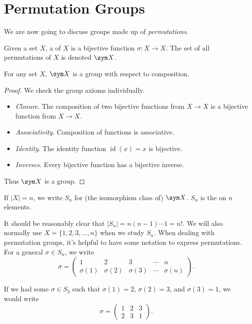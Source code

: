 \documentclass[a4]{scrreprt}
\newcommand{\newsection}{\section}
\begin{document}
\newsection{Permutation Groups}

We are now going to discuss groups made up of \emph{permutations}.

\begin{definition}[Permutations]
	Given a set $X$, a  of $X$ is a bijective function $\sigma: X \rightarrow X$. The set of all permutations of $X$ is denoted $\sym X$.
\end{definition}

\begin{theorem}
	For any set $X$, $\sym X$ is a group with respect to composition. 
\end{theorem}
\begin{proof}
	We check the group axioms individually.
	\begin{itemize}
		\item \emph{Closure}. The composition of two bijective functions from $X \rightarrow X$ is a bijective function from $X \rightarrow X$.
		\item \emph{Associativity}. Composition of functions is associative.
		\item \emph{Identity}. The identity function $\operatorname{id}(x) = x$ is bijective.
		\item \emph{Inverses}. Every bijective function has a bijective inverse.
	\end{itemize}
	Thus $\sym X$ is a group.
\end{proof}

\begin{definition}
	If $|X| = n$, we write $S_n$ for (the isomorphism class of) $\sym X$. $S_n$ is the  on $n$ elements.
\end{definition}

It should be reasonably clear that $|S_n| = n(n - 1) \cdots 1 = n!$. We will also normally use $X = \{1, 2, 3, \dots, n \}$ when we study $S_n$. When dealing with permutation groups, it's helpful to have some notation to express permutations. For a general $\sigma \in S_n$, we write
$$
\sigma = \begin{pmatrix}
	1 & 2 & 3 & \cdots & n \\
	\sigma(1) & \sigma(2) & \sigma(3) & \cdots & \sigma(n)
\end{pmatrix}.
$$

\begin{example}
	If we had some $\sigma \in S_3$ such that $\sigma(1) = 2$, $\sigma(2) = 3$, and $\sigma(3) = 1$, we would write
	$$
\sigma = \begin{pmatrix}
	1 & 2 & 3 \\
	2 & 3 & 1
\end{pmatrix}.
$$
\end{example}
\end{document}

